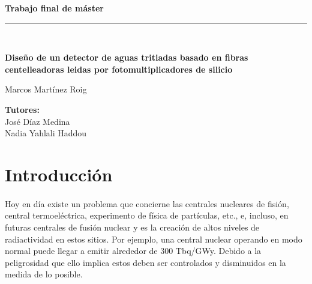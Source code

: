 \documentclass[11pt, a4paper]{article}
\begin{document}
\begin{titlepage}
\begin{center}
\begin{large}
\textbf{{\large Trabajo final de máster}}\\
\rule{80mm}{0.1mm}\\

\end{large}
\vspace*{0.2in}
\begin{Large}
\textbf{Diseño de un detector de aguas tritiadas basado en fibras centelleadoras leidas por fotomultiplicadores de silicio} \\
\end{Large}
\vspace*{2 cm}

\begin{large}
Marcos Martínez Roig\\
\end{large}
\end{center}

\vspace*{0.3in}
\vspace*{0.1in}
\begin{large}
\begin{flushright}
\item[\bf Tutores:\hspace{4cm} ]\quad  \\ José Díaz Medina\\
Nadia Yahlali Haddou\\
\end{flushright}
\end{large}

\end{titlepage}



\tableofcontents 
\newpage


\section {Introducción}
\paragraph {}
Hoy en día existe un problema que concierne  las  centrales nucleares de fisión, central termoeléctrica,  experimento de física de partículas, etc., e, incluso, en futuras centrales de fusión nuclear y es la creación de altos niveles de radiactividad en estos sitios. Por ejemplo, una central nuclear operando en modo normal puede llegar a emitir alrededor de 300 Tbq/GWy.  Debido a la peligrosidad que ello implica estos deben ser controlados y disminuidos en la medida de lo posible.
\end{document}
